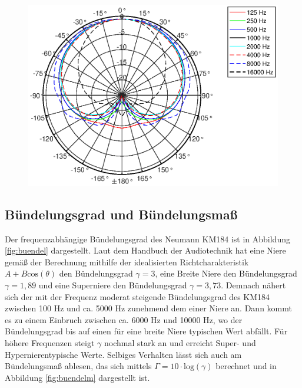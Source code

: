 \begin{figure}[bth]
    \centering
    \includegraphics[width=\linewidth]{Figures/KM184_allfreqs}
    \label{fig:Polar_allfreqs}
\end{figure}


\subsection{Bündelungsgrad und Bündelungsmaß}
\label{subsec:e}

Der frequenzabhängige Bündelungsgrad des Neumann KM184 ist in Abbildung \ref{fig:buendel} dargestellt. 
Laut dem Handbuch der Audiotechnik \cite{Weinzierl08} hat eine Niere gemäß der Berechnung mithilfe der idealisierten Richtcharakteristik $A + B \mathrm{cos}(\theta)$ den Bündelungsgrad $\gamma = 3$, eine Breite Niere den Bündelungsgrad $\gamma = 1,89$ und eine Superniere den Bündelungsgrad $\gamma = 3,73$.
Demnach nähert sich der mit der Frequenz moderat steigende Bündelungsgrad des KM184 zwischen 100 Hz und ca. 5000 Hz zunehmend dem einer Niere an.
Dann kommt es zu einem Einbruch zwischen ca. 6000 Hz und 10000 Hz, wo der Bündelungsgrad bis auf einen für eine breite Niere typischen Wert abfällt. 
Für höhere Frequenzen steigt $\gamma$ nochmal stark an und erreicht  Super- und Hypernierentypische Werte. 
Selbiges Verhalten lässt sich auch am Bündelungsmaß ablesen, das sich mittels $\Gamma = 10\cdot \mathrm{log}(\gamma)$ berechnet
und in Abbildung \ref{fig:buendelm} dargestellt ist.

